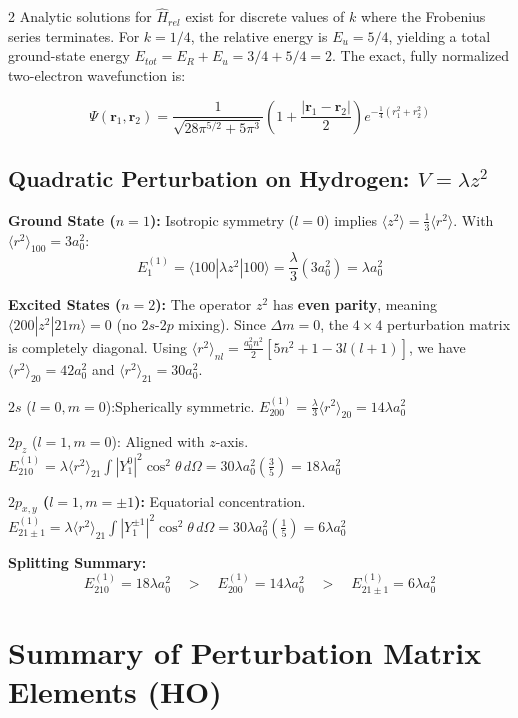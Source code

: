 \documentclass[9pt,a4paper]{article} %
\begin{document}
\begin{multicols}{2}
Analytic solutions for $\hat{H}_{rel}$ exist for discrete values of $k$ where the Frobenius series terminates. For $k=1/4$, the relative energy is $E_u = 5/4$, yielding a total ground-state energy $E_{tot} = E_R + E_u = 3/4 + 5/4 = 2$. The exact, fully normalized two-electron wavefunction is:

\begin{equation*}
\Psi(\mathbf{r}_1,\mathbf{r}_2) = \frac{1}{\sqrt{28\pi^{5/2} + 5\pi^3}}\left(1 + \frac{|\mathbf{r}_1 - \mathbf{r}_2|}{2}\right) e^{-\frac{1}{4}(r_1^2 + r_2^2)}
\end{equation*}
\subsection{Quadratic Perturbation on Hydrogen: $V = \lambda z^2$}

\textbf{Ground State ($n=1$):} Isotropic symmetry ($l=0$) implies $\langle z^2 \rangle = \frac{1}{3}\langle r^2 \rangle$. With $\langle r^2 \rangle_{100} = 3a_0^2$:
\[ E_1^{(1)} = \langle 100 | \lambda z^2 | 100 \rangle = \frac{\lambda}{3}(3a_0^2) = \lambda a_0^2 \]

\textbf{Excited States ($n=2$):} The operator $z^2$ has \textbf{even parity}, meaning $\langle 200 | z^2 | 21m \rangle = 0$ (no $2s$-$2p$ mixing). Since $\Delta m = 0$, the $4\times 4$ perturbation matrix is completely diagonal. 
Using $\langle r^2 \rangle_{nl} = \frac{a_0^2 n^2}{2} [5n^2 + 1 - 3l(l+1)]$, we have $\langle r^2 \rangle_{20} = 42a_0^2$ and $\langle r^2 \rangle_{21} = 30a_0^2$.

    $2s$ ($l=0, m=0$):Spherically symmetric. 
    $E_{200}^{(1)} = \frac{\lambda}{3} \langle r^2 \rangle_{20} = 14 \lambda a_0^2$
    
     $2p_z$ ($l=1, m=0$): Aligned with $z$-axis. 
    $E_{210}^{(1)} = \lambda \langle r^2 \rangle_{21} \int |Y_1^0|^2 \cos^2\theta \, d\Omega = 30\lambda a_0^2 \left(\frac{3}{5}\right) = 18 \lambda a_0^2$
    
     \textbf{$2p_{x,y}$ ($l=1, m=\pm 1$):} Equatorial concentration. 
    $E_{21\pm 1}^{(1)} = \lambda \langle r^2 \rangle_{21} \int |Y_1^{\pm 1}|^2 \cos^2\theta \, d\Omega = 30\lambda a_0^2 \left(\frac{1}{5}\right) = 6 \lambda a_0^2$

\textbf{Splitting Summary:}
\[ \boxed{ E_{210}^{(1)} = 18\lambda a_0^2 \quad > \quad E_{200}^{(1)} = 14\lambda a_0^2 \quad > \quad E_{21\pm 1}^{(1)} = 6\lambda a_0^2 } \]
\section{Summary of Perturbation Matrix Elements (HO)}


\end{multicols}
\end{document}
